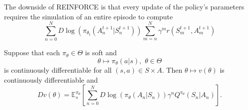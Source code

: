 The downside of REINFORCE is that every update of the policy's parameters requires the simulation of an entire episode to compute 
\[
    \sum_{n=0}^N D \log(\pi_{\theta_t} (A_n^{t+1} | S_n^{t+1})) \sum_{m=n}^N \gamma^m r(S_m^{t+1}, A_m^{t+1})
\]
\begin{theorem}\label{policy_gradients_action_value}
    Suppose that each \( \pi_\theta \in \Theta \) is soft and 
    \[
        \theta \mapsto \pi_\theta(a|s), \,\, \theta \in \Theta
    \]
    is continuously differentiable for all \( (s,a) \in S \times A \). Then 
    \( \theta \mapsto v(\theta) \) is continuously differentiable and
    \[
        D v(\theta) = \mathbb{E}_s^{\pi_\theta} \left[ \sum_{ n = 0}^N D \log(\pi_\theta(A_n | S_n)) \gamma^n Q^{\pi_\theta}(S_n | A_n) \right].
    \]  
\end{theorem}
